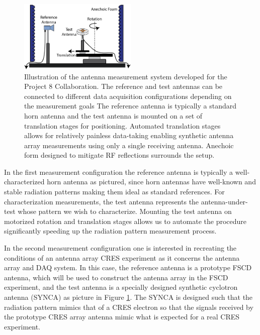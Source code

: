 \begin{figure}[htbp]
    \centering
    \includegraphics[width=0.5\textwidth]{figs/Chapter-5/230409_measurement_system_figure_cartoon.png}
    \caption{Illustration of the antenna measurement system developed for the Project 8 Collaboration. The reference and test antennas can be connected to different data acquisition configurations depending on the measurement goals The reference antenna is typically a standard horn antenna and the test antenna is mounted on a set of translation stages for positioning. Automated translation stages allows for relatively painless data-taking enabling synthetic antenna array measurements using only a single receiving antenna. Anechoic form designed to mitigate RF reflections surrounds the setup.}
    \label{fig:meas-sys-cartoon}
\end{figure}

In the first measurement configuration the reference antenna is typically a well-characterized horn antenna as pictured, since horn antennas have well-known and stable radiation patterns making them ideal as standard references. For characterization measurements, the test antenna represents the antenna-under-test whose pattern we wish to characterize. Mounting the test antenna on motorized rotation and translation stages allows us to automate the procedure significantly speeding up the radiation pattern measurement process. 

In the second measurement configuration one is interested in recreating the conditions of an antenna array CRES experiment as it concerns the antenna array and DAQ system. In this case, the reference antenna is a prototype FSCD antenna, which will be used to construct the antenna array in the FSCD experiment, and the test antenna is a specially designed synthetic cyclotron antenna (SYNCA) as picture in Figure \ref{fig:meas-sys-cartoon}. The SYNCA is designed such that the radiation pattern mimics that of a CRES electron so that the signals received by the prototype CRES array antenna mimic what is expected for a real CRES experiment. 


